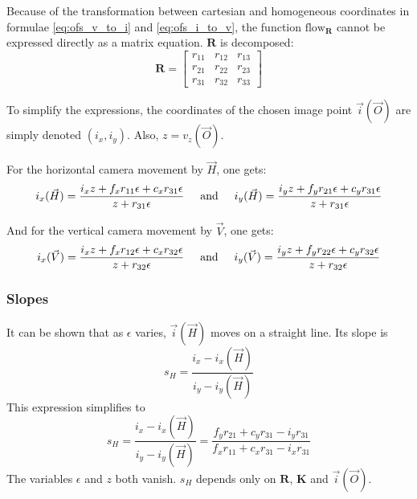 \documentclass{scrreprt}
\newcommand{\matr}[1]{\mathbf{#1}}
\begin{document}
Because of the transformation between cartesian and homogeneous coordinates in formulae \ref{eq:ofs_v_to_i} and \ref{eq:ofs_i_to_v}, the function $\text{flow}_{\matr{R}}$ cannot be expressed directly as a matrix equation. $\matr{R}$ is decomposed:
\begin{equation}
\matr{R} = \begin{bmatrix}
	r_{11} & r_{12} & r_{13} \\
	r_{21} & r_{22} & r_{23} \\
	r_{31} & r_{32} & r_{33}
\end{bmatrix}
\end{equation}

To simplify the expressions, the coordinates of the chosen image point $\vec{i}(\vec{O})$ are simply denoted $(i_x, i_y)$. Also, $z = v_z(\vec{O})$.

For the horizontal camera movement by $\vec{H}$, one gets:
\begin{equation}
i_x(\vec{H}) = \frac{i_x z + f_x r_{11} \epsilon + c_x r_{31} \epsilon}{z + r_{31} \epsilon}
\hspace{5mm} \text{and} \hspace{5mm}
i_y(\vec{H}) = \frac{i_y z + f_y r_{21} \epsilon + c_y r_{31} \epsilon}{z + r_{31} \epsilon}
\end{equation}

And for the vertical camera movement by $\vec{V}$, one gets:
\begin{equation}
i_x(\vec{V}) = \frac{i_x z + f_x r_{12} \epsilon + c_x r_{32} \epsilon}{z + r_{32} \epsilon}
\hspace{5mm} \text{and} \hspace{5mm}
i_y(\vec{V}) = \frac{i_y z + f_y r_{22} \epsilon + c_y r_{32} \epsilon}{z + r_{32} \epsilon}
\end{equation}


\subsubsection{Slopes}
It can be shown that as $\epsilon$ varies, $\vec{i}(\vec{H})$ moves on a straight line. Its slope is
\begin{equation}
s_H = \frac{i_x - i_x(\vec{H})}{i_y - i_y(\vec{H})}
\end{equation}
This expression simplifies to
\begin{equation}
s_H = \frac{i_x - i_x(\vec{H})}{i_y - i_y(\vec{H})} = \frac{f_y r_{21} + c_y r_{31} - i_y r_{31}}{f_x r_{11} + c_x r_{31} - i_x r_{31}}
\end{equation}
The variables $\epsilon$ and $z$ both vanish. $s_H$ depends only on $\matr{R}$, $\matr{K}$ and $\vec{i}(\vec{O})$.
\end{document}
